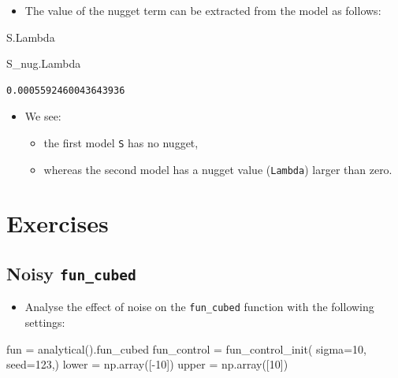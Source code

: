 \documentclass[
  letterpaper,
  DIV=11,
  numbers=noendperiod]{scrreprt}
\newenvironment{Shaded}{\begin{snugshade}}{\end{snugshade}}
\newcommand{\DecValTok}[1]{\textcolor[rgb]{0.68,0.00,0.00}{#1}}
\newcommand{\NormalTok}[1]{\textcolor[rgb]{0.00,0.23,0.31}{#1}}
\newcommand{\OperatorTok}[1]{\textcolor[rgb]{0.37,0.37,0.37}{#1}}
\providecommand{\tightlist}{%
  \setlength{\itemsep}{0pt}\setlength{\parskip}{0pt}}\usepackage{longtable,booktabs,array}
\begin{document}
\begin{itemize}
\tightlist
\item
  The value of the nugget term can be extracted from the model as
  follows:
\end{itemize}

\begin{Shaded}
\begin{Highlighting}[]
\NormalTok{S.Lambda}
\end{Highlighting}
\end{Shaded}

\begin{Shaded}
\begin{Highlighting}[]
\NormalTok{S\_nug.Lambda}
\end{Highlighting}
\end{Shaded}

\begin{verbatim}
0.0005592460043643936
\end{verbatim}

\begin{itemize}
\tightlist
\item
  We see:

  \begin{itemize}
  \tightlist
  \item
    the first model \texttt{S} has no nugget,
  \item
    whereas the second model has a nugget value (\texttt{Lambda}) larger
    than zero.
  \end{itemize}
\end{itemize}

\hypertarget{exercises-6}{%
\section{Exercises}\label{exercises-6}}

\hypertarget{noisy-fun_cubed}{%
\subsection{\texorpdfstring{Noisy
\texttt{fun\_cubed}}{Noisy fun\_cubed}}\label{noisy-fun_cubed}}

\begin{itemize}
\tightlist
\item
  Analyse the effect of noise on the \texttt{fun\_cubed} function with
  the following settings:
\end{itemize}

\begin{Shaded}
\begin{Highlighting}[]
\NormalTok{fun }\OperatorTok{=}\NormalTok{ analytical().fun\_cubed}
\NormalTok{fun\_control }\OperatorTok{=}\NormalTok{ fun\_control\_init(}
\NormalTok{    sigma}\OperatorTok{=}\DecValTok{10}\NormalTok{,}
\NormalTok{    seed}\OperatorTok{=}\DecValTok{123}\NormalTok{,)}
\NormalTok{lower }\OperatorTok{=}\NormalTok{ np.array([}\OperatorTok{{-}}\DecValTok{10}\NormalTok{])}
\NormalTok{upper }\OperatorTok{=}\NormalTok{ np.array([}\DecValTok{10}\NormalTok{])}
\end{Highlighting}
\end{Shaded}
\end{document}

